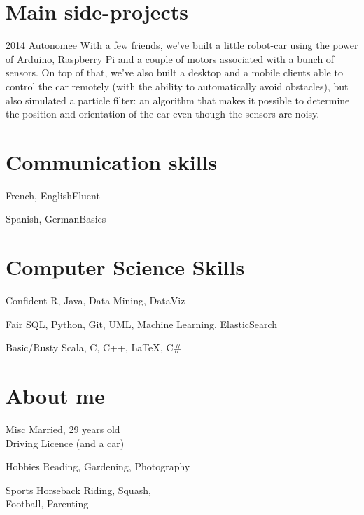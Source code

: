 \documentclass{tccv}
\begin{document}
\section{Main side-projects}

\begin{yearlist}

\item{2014}
     {\href{https://github.com/halflings/autonomee}{Autonomee}}
     {With a few friends, we've built a little robot-car using the power of Arduino, Raspberry Pi and a couple of motors associated with a bunch of sensors. On top of that, we've also built a desktop and a mobile clients able to control the car remotely (with the ability to automatically avoid obstacles), but also simulated a particle filter: an algorithm that makes it possible to determine the position and orientation of the car even though the sensors are noisy.}

\end{yearlist}

\section{Communication skills}

\begin{factlist}
\item{French, English}{Fluent}
\item{Spanish, German}{Basics}
\end{factlist}

\section{Computer Science Skills}

\begin{factlist}

\item{Confident}
     {R, Java, Data Mining, DataViz}

\item{Fair}
     {SQL, Python, Git, UML, Machine Learning, ElasticSearch}

\item{Basic/Rusty}
     {Scala, C, C++, \LaTeX, C\#}

\end{factlist}

\section{About me}

\begin{factlist}

\item{Misc}
     {Married, 29 years old\\Driving Licence (and a car)\\}

\item{Hobbies}
     {Reading, Gardening, Photography}

\item{Sports}
     {Horseback Riding, Squash,\\Football, Parenting}

\end{factlist}
\end{document}
